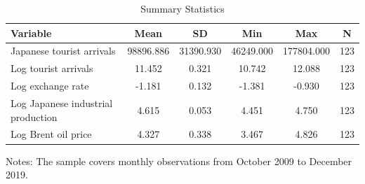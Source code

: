 \begin{table}[H]
\centering
\caption{Summary Statistics}
\label{tab:summary}
\begin{tabular}{lccccc}
\toprule
Variable & Mean & SD & Min & Max & N \\
\midrule
Japanese tourist arrivals & 98896.886 & 31390.930 & 46249.000 & 177804.000 & 123 \\
Log tourist arrivals & 11.452 & 0.321 & 10.742 & 12.088 & 123 \\
Log exchange rate & -1.181 & 0.132 & -1.381 & -0.930 & 123 \\
Log Japanese industrial production & 4.615 & 0.053 & 4.451 & 4.750 & 123 \\
Log Brent oil price & 4.327 & 0.338 & 3.467 & 4.826 & 123 \\
\bottomrule
\end{tabular}
\begin{minipage}{0.9\textwidth}
\vspace{0.4em}\footnotesize Notes: The sample covers monthly observations from October 2009 to December 2019.
\end{minipage}
\end{table}
